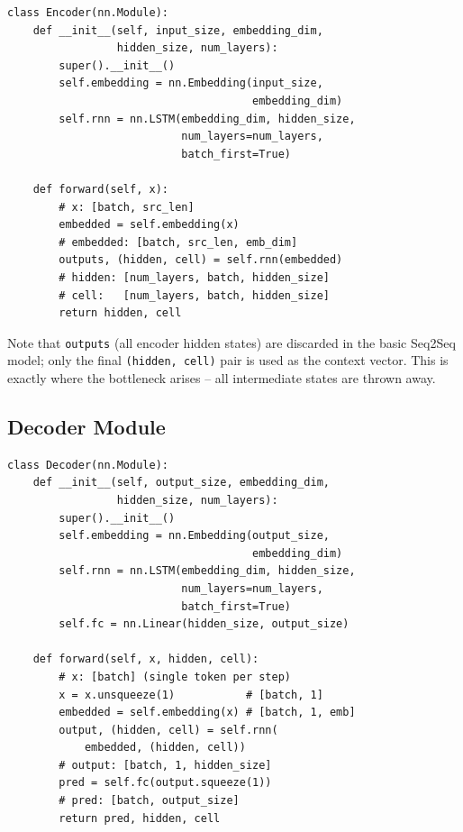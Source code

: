 \documentclass[12pt,a4paper]{article}
\begin{document}
\begin{tcolorbox}[colback=gray!5!white,colframe=gray!60!black,title=\texttt{Encoder} (PyTorch)]
\begin{verbatim}
class Encoder(nn.Module):
    def __init__(self, input_size, embedding_dim,
                 hidden_size, num_layers):
        super().__init__()
        self.embedding = nn.Embedding(input_size,
                                      embedding_dim)
        self.rnn = nn.LSTM(embedding_dim, hidden_size,
                           num_layers=num_layers,
                           batch_first=True)

    def forward(self, x):
        # x: [batch, src_len]
        embedded = self.embedding(x)
        # embedded: [batch, src_len, emb_dim]
        outputs, (hidden, cell) = self.rnn(embedded)
        # hidden: [num_layers, batch, hidden_size]
        # cell:   [num_layers, batch, hidden_size]
        return hidden, cell
\end{verbatim}
\end{tcolorbox}

Note that \texttt{outputs} (all encoder hidden states) are discarded in the basic Seq2Seq model;
only the final \texttt{(hidden, cell)} pair is used as the context vector. This is exactly
where the bottleneck arises -- all intermediate states are thrown away.

\subsection{Decoder Module}

\begin{tcolorbox}[colback=gray!5!white,colframe=gray!60!black,title=\texttt{Decoder} (PyTorch)]
\begin{verbatim}
class Decoder(nn.Module):
    def __init__(self, output_size, embedding_dim,
                 hidden_size, num_layers):
        super().__init__()
        self.embedding = nn.Embedding(output_size,
                                      embedding_dim)
        self.rnn = nn.LSTM(embedding_dim, hidden_size,
                           num_layers=num_layers,
                           batch_first=True)
        self.fc = nn.Linear(hidden_size, output_size)

    def forward(self, x, hidden, cell):
        # x: [batch] (single token per step)
        x = x.unsqueeze(1)           # [batch, 1]
        embedded = self.embedding(x) # [batch, 1, emb]
        output, (hidden, cell) = self.rnn(
            embedded, (hidden, cell))
        # output: [batch, 1, hidden_size]
        pred = self.fc(output.squeeze(1))
        # pred: [batch, output_size]
        return pred, hidden, cell
\end{verbatim}
\end{tcolorbox}
\end{document}
